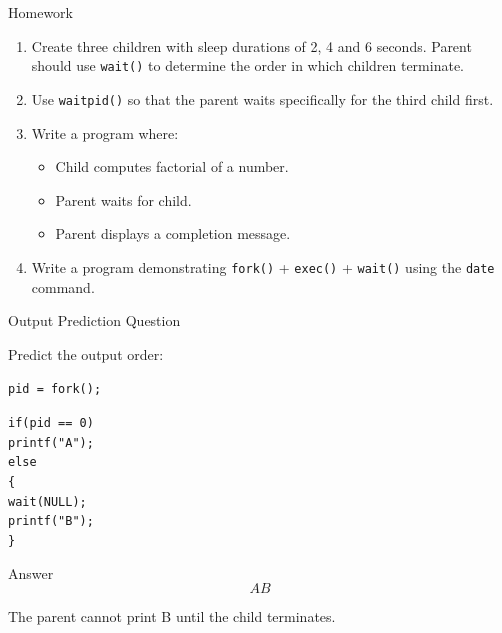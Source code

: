 \documentclass[aspectratio=169]{beamer}
\begin{document}
\begin{frame}{Homework}

\begin{enumerate}

    \item Create three children with sleep durations of 2, 4 and 6 seconds.
    Parent should use \texttt{wait()} to determine the order in which children
    terminate.

    \item Use \texttt{waitpid()} so that the parent waits specifically for the
    third child first.

    \item Write a program where:
    \begin{itemize}
        \item Child computes factorial of a number.
        \item Parent waits for child.
        \item Parent displays a completion message.
    \end{itemize}

    \item Write a program demonstrating
    \texttt{fork()} + \texttt{exec()} + \texttt{wait()} using the
    \texttt{date} command.

\end{enumerate}

\end{frame}

\begin{frame}{Output Prediction Question}

Predict the output order:

\begin{center}
\texttt{pid = fork();}
\end{center}

\begin{center}
\texttt{if(pid == 0)}\\
\texttt{\quad printf("A");}\\
\texttt{else}\\
\texttt{\{}\\
\texttt{\quad wait(NULL);}\\
\texttt{\quad printf("B");}\\
\texttt{\}}
\end{center}

\vspace{0.3cm}

\pause

\begin{block}{Answer}
\[
\boxed{AB}
\]

The parent cannot print B until the child terminates.
\end{block}

\end{frame}
\end{document}

